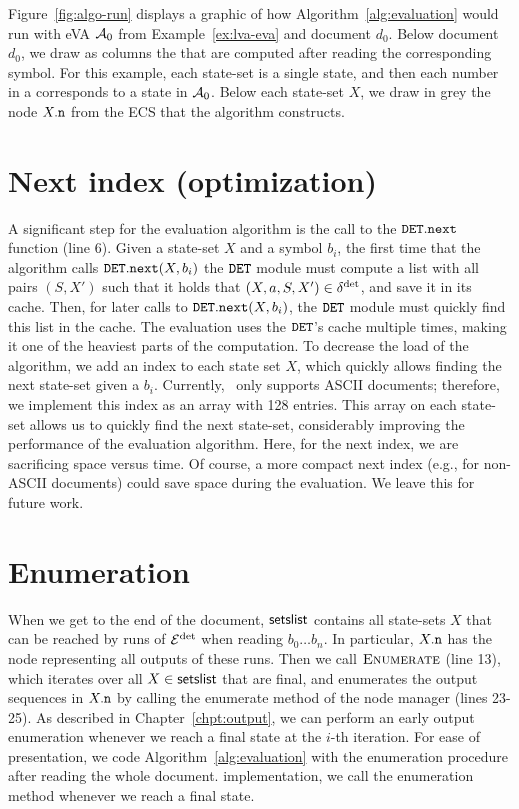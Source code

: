 \begin{example}
	Figure~\ref{fig:algo-run} displays a graphic of how
Algorithm~\ref{alg:evaluation} would run with eVA $\mathcal{A}_0$ from
Example~\ref{ex:lva-eva} and document $d_0$. Below document $d_0$, we draw as
columns the \cstateslistss{} that are computed after reading the corresponding
symbol. For this example, each state-set is a single state, and then each number
in a \cstateslists{} corresponds to a state in $\mathcal{A}_0$. Below each state-set
$X$, we draw in grey the node $X.\mathtt{n}$ from the ECS that the algorithm
constructs. 
\end{example}

\section{Next index (optimization)} 
A significant step for the evaluation algorithm is the call to the
$\mathtt{DET}.\texttt{next}$ function (line 6). Given a state-set $X$ and a symbol
$b_i$, the first time that the algorithm calls $\mathtt{DET}.\texttt{next}(X, b_i)$ the
$\mathtt{DET}$ module must compute a list with all pairs $(S, X')$ such that it holds
that $(X,a,S,X') \in \delta^{\operatorname{det}}$, and save it in its cache. Then, for later
calls to  $\mathtt{DET}.\texttt{next}(X, b_i)$, the $\mathtt{DET}$ module must quickly find
this list in the cache. The evaluation uses the $\mathtt{DET}$'s cache multiple times,
making it  one of the heaviest parts of the computation. To decrease the load of
the algorithm, we add an index to each state set $X$, which quickly allows
finding the next state-set given a $b_i$. Currently, \rematch\ only supports
ASCII documents; therefore, we implement this index as an array with 128
entries. This array on each state-set allows us to quickly find the next
state-set, considerably improving the performance of the evaluation algorithm.
Here, for the next index, we are sacrificing space versus time. Of course, a
more compact next index (e.g., for non-ASCII documents) could save space during
the evaluation. We leave this for future work. 

\section{Enumeration} 
When we get to the end of the document, $\textsf{setslist}$ contains all state-sets
$X$ that can be reached by runs of $\mathcal{E}^{\operatorname{det}}$ when reading $b_0 \ldots b_n$. In
particular, $X.\mathtt{n}$ has the node representing all outputs of these runs. Then
we call $\textproc{Enumerate}$ (line 13), which iterates over all $X \in
\textsf{setslist}$ that are final, and enumerates the output sequences in $X.\mathtt{n}$
by calling the enumerate method of the node manager (lines 23-25).
%
As described in Chapter~\ref{chpt:output}, we can perform an early output
enumeration whenever we reach a final state at the $i$-th iteration. For ease of
presentation, we code Algorithm~\ref{alg:evaluation} with the enumeration
procedure after reading the whole document. %
implementation, we call the enumeration method whenever we reach a final state.


